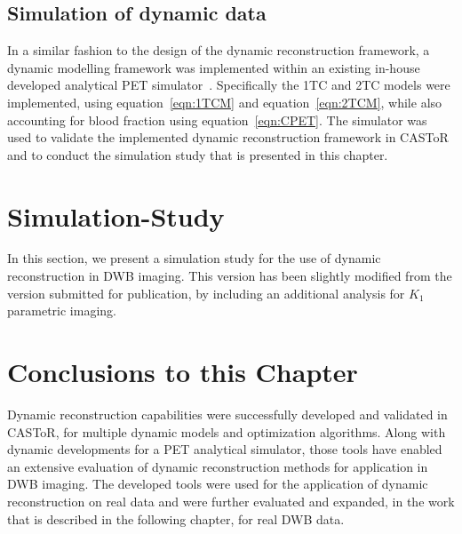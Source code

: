\subsection{Simulation of dynamic data}
In a similar fashion to the design of the dynamic reconstruction framework, a dynamic modelling framework was implemented within an existing in-house developed analytical PET simulator~\cite{Stute2015}. Specifically the 1TC and 2TC models were implemented, using equation~\ref{eqn:1TCM} and equation~\ref{eqn:2TCM}, while also accounting for blood fraction using equation~\ref{eqn:CPET}.
The simulator was used to validate the implemented dynamic reconstruction framework in CASToR and to conduct the simulation study that is presented in this chapter.

\section{Simulation-Study}
In this section, we present a simulation study for the use of dynamic reconstruction in DWB imaging. This version has been slightly modified from the version submitted for publication, by including an additional analysis for $K_1$ parametric imaging.

\cleardoublepage





\section{Conclusions to this Chapter}
Dynamic reconstruction capabilities were successfully developed and validated in CASToR, for multiple dynamic models and optimization algorithms. Along with dynamic developments for a PET analytical simulator, those tools have enabled an extensive evaluation of dynamic reconstruction methods for application in DWB imaging. The developed tools were used for the application of dynamic reconstruction on real data and were further evaluated and expanded, in the work that is described in the following chapter, for real DWB data.